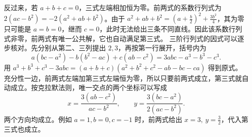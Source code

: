 \documentclass[UTF8,zihao=-4,fontset=fandol]{ctexart}
\begin{document}
反过来，若 $a+b+c=0$，三式左端相加恒为零。前两式的系数行列式为 $2(ac-b^2)=-2(a^2+ab+b^2)$。由于 $a^2+ab+b^2=(a+\frac{b}{2})^2+\frac{3b^2}{4}$，其为零只可能是 $a=b=0$，继而 $c=0$，此时无法给出三条不同直线。因此该系数行列式非零，前两式有唯一公共解，它也自动满足第三式。
三阶行列式的因式可以逐步核对。先分别从第二、三列提出 $2,3$，再按第一行展开，括号内为
\[
a(bc-a^2)-b(b^2-ac)+c(ab-c^2)=3abc-a^3-b^3-c^3.
\]
用 $a^3+b^3+c^3-3abc=(a+b+c)(a^2+b^2+c^2-ab-bc-ca)$ 得到原式。充分性一边，前两式左端加第三式左端恒为零，所以只要前两式成立，第三式就自动成立。按克拉默法则，唯一交点的两个坐标可以写成
\[
x=\frac{3(ab-c^2)}{ac-b^2},\qquad
y=\frac{3(bc-a^2)}{2(ac-b^2)}.
\]
\Verify 两个方向均成立。例如 $a=1,b=0,c=-1$ 时，前两式给出 $x=3,\ y=\frac{3}{2}$，代入第三式也成立。
\end{document}
